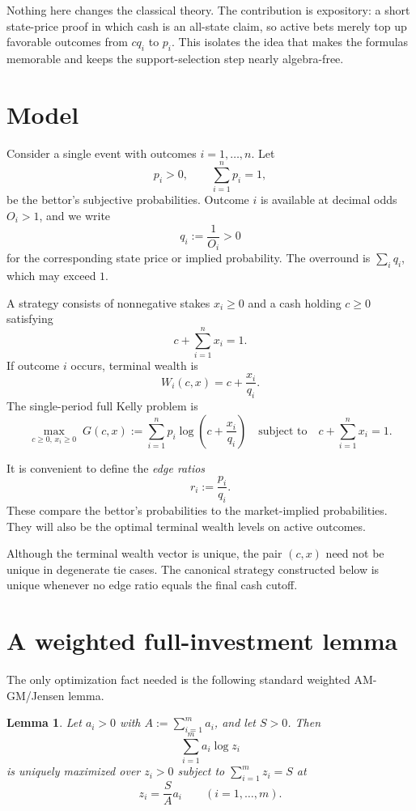 \documentclass[11pt]{article}
\newtheorem{lemma}[theorem]{Lemma}
\begin{document}
Nothing here changes the classical theory. The contribution is expository: a short state-price proof in which cash is an all-state claim, so active bets merely top up favorable outcomes from $cq_i$ to $p_i$. This isolates the idea that makes the formulas memorable and keeps the support-selection step nearly algebra-free.

\section{Model}
Consider a single event with outcomes $i=1,\dots,n$. Let
\[
  p_i>0, \qquad \sum_{i=1}^n p_i=1,
\]
be the bettor's subjective probabilities. Outcome $i$ is available at decimal odds $O_i>1$, and we write
\[
  q_i:=\frac{1}{O_i}>0
\]
for the corresponding state price or implied probability. The overround is $\sum_i q_i$, which may exceed $1$.

A strategy consists of nonnegative stakes $x_i\ge 0$ and a cash holding $c\ge 0$ satisfying
\[
  c+\sum_{i=1}^n x_i=1.
\]
If outcome $i$ occurs, terminal wealth is
\[
  W_i(c,x)=c+\frac{x_i}{q_i}.
\]
The single-period full Kelly problem is
\begin{equation}\label{eq:kelly-problem}
  \max_{c\ge 0,\,x_i\ge 0}\; G(c,x):=\sum_{i=1}^n p_i\log\!\left(c+\frac{x_i}{q_i}\right)
  \quad\text{subject to}\quad c+\sum_{i=1}^n x_i=1.
\end{equation}

It is convenient to define the \emph{edge ratios}
\[
  r_i:=\frac{p_i}{q_i}.
\]
These compare the bettor's probabilities to the market-implied probabilities. They will also be the optimal terminal wealth levels on active outcomes.

Although the terminal wealth vector is unique, the pair $(c,x)$ need not be unique in degenerate tie cases. The canonical strategy constructed below is unique whenever no edge ratio equals the final cash cutoff.

\section{A weighted full-investment lemma}
The only optimization fact needed is the following standard weighted AM-GM/Jensen lemma.

\begin{lemma}\label{lem:full-investment}
Let $a_i>0$ with $A:=\sum_{i=1}^m a_i$, and let $S>0$. Then
\[
  \sum_{i=1}^m a_i\log z_i
\]
is uniquely maximized over $z_i>0$ subject to $\sum_{i=1}^m z_i=S$ at
\[
  z_i=\frac{S}{A}a_i \qquad (i=1,\dots,m).
\]
\end{lemma}
\end{document}
